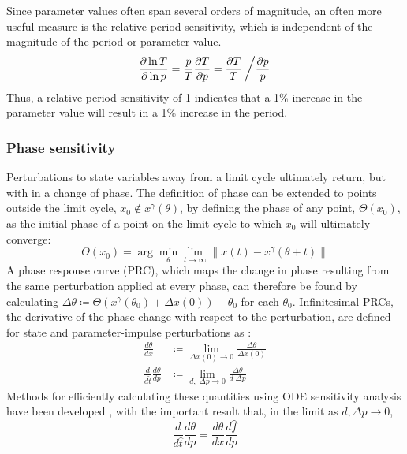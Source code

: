 Since parameter values often span several orders of magnitude, an often more useful measure is the relative period sensitivity, which is independent of the magnitude of the period or parameter value.
\begin{equation}
  \frac{\partial \ln T}{\partial \ln p} = \frac{p}{T}\frac{\partial T}{\partial p} = \frac{\partial T}{T} \left/ \frac{\partial p}{p} \right.\label{eq:relperiodsens}
\end{equation}
Thus, a relative period sensitivity of 1 indicates that a 1\% increase in the parameter value will result in a 1\% increase in the period.

\subsubsection{Phase sensitivity}

Perturbations to state variables away from a limit cycle ultimately return, but with in a change of phase.
The definition of phase can be extended to points outside the limit cycle, $x_0 \not\in x^\gamma(\theta)$, by defining the phase of any point, $\Theta(x_0)$, as the initial phase of a point on the limit cycle to which $x_0$ will ultimately converge:
\begin{equation}
  \Theta(x_0) = \arg\min_\theta \lim_{t \to \infty} \lVert x(t)
  - x^\gamma(\theta + t)\rVert
  \label{eq:extendedphase2}
\end{equation}
A phase response curve (PRC), which maps the change in phase resulting from the same
perturbation applied at every phase, can therefore be found by calculating $
\Delta\theta \coloneqq \Theta(x^\gamma(\theta_0) + \Delta x(0)) - \theta_0$ for each
$\theta_0$. Infinitesimal PRCs, the derivative of the phase
change with respect to the perturbation, are defined for state and
parameter-impulse perturbations as \cite{Taylor2008a}:
\begin{align}
  \frac{d\theta}{dx} &\coloneqq \lim_{\Delta x(0) \to 0} \frac{\Delta\theta}{\Delta
  x(0)} \label{eq:sPRC}\\
  \frac{d}{d\hat{t}}\frac{d\theta}{dp} &\coloneqq \lim_{d,\; \Delta p \to 0}
  \frac{\Delta\theta}{d \; \Delta p}
  \label{eq:PRC}
\end{align}
Methods for efficiently calculating these quantities using ODE sensitivity
analysis have been developed \cite{Taylor2008a}, with the important result
that, in the limit as $d, \Delta p \to 0$, 
\begin{equation}
  \frac{d}{d\hat{t}}\frac{d\theta}{dp} = \frac{d\theta}{dx}\frac{d\hat{f}}{dp} 
  \label{eq:pPRCequiv}
\end{equation}

